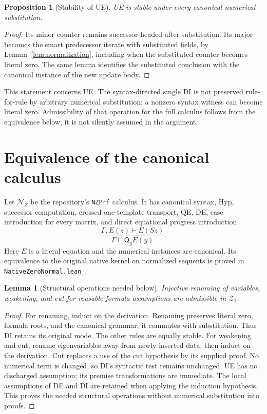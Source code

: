 \documentclass[11pt]{article}
\newtheorem{lemma}[theorem]{Lemma}
\newtheorem{proposition}[theorem]{Proposition}
\theoremstyle{definition}\newtheorem{definition}[theorem]{Definition}
\newcommand{\Zone}{\mathcal Z_1}
\newcommand{\Q}{\mathsf Q}
\begin{document}
\begin{proposition}[Stability of UE]
UE is stable under every canonical numerical substitution.
\end{proposition}
\begin{proof}
Its minor counter remains successor-headed after substitution. Its
major becomes the smart predecessor iterate with substituted fields,
by Lemma~\ref{lem:normalization}, including when the substituted
counter becomes literal zero. The same lemma identifies the substituted
conclusion with the canonical instance of the new update body.
\end{proof}
This statement concerns UE. The syntax-directed single DI is not
preserved rule-for-rule by arbitrary numerical substitution: a nonzero
syntax witness can become literal zero. Admissibility of that operation
for the full calculus follows from the equivalence below; it is not
silently assumed in the argument.

\section{Equivalence of the canonical calculus}
\label{sec:canonical-equivalence}

Let $\mathcal N_Z$ be the repository's \texttt{NZPrf} calculus. It has
canonical syntax, Hyp, successor computation, crossed one-template transport,
QE, DE, case introduction for every matrix, and direct equational
progress introduction
\[
 \frac{\Gamma,E(z)\vdash E(Sz)}{\Gamma\vdash\Q_yE(y)}.
 \tag{QI}\label{eq:qi}
\]
Here $E$ is a literal equation and the numerical instances are canonical.
Its equivalence to the original native kernel on normalized sequents is
proved in \texttt{NativeZeroNormal.lean}~\cite{normal}.

\begin{lemma}[Structural operations needed below]
Injective renaming of variables, weakening, and cut for reusable
formula assumptions are admissible in $\Zone$.
\end{lemma}
\begin{proof}
For renaming, induct on the derivation. Renaming preserves literal zero,
formula roots, and the canonical grammar; it commutes with substitution.
Thus DI retains its original mode. The other rules are equally stable.
For weakening and cut, rename eigenvariables away from newly inserted
data, then induct on the derivation. Cut replaces a use of the cut
hypothesis by its supplied proof. No numerical term is changed, so DI's
syntactic test remains unchanged. UE has no discharged assumption; its
premise transformations are immediate. The local assumptions of DE and
DI are retained when applying the induction hypothesis. This proves the
needed structural operations without numerical substitution into proofs.
\end{proof}
\end{document}
